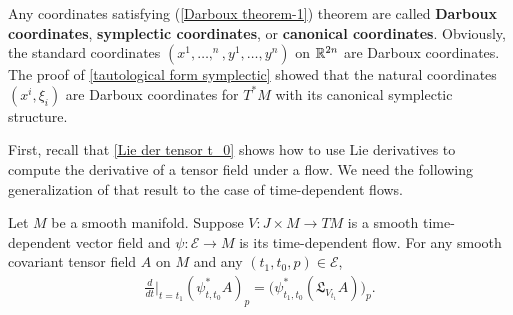 Any coordinates satisfying (\ref{Darboux theorem-1}) theorem are called \textbf{Darboux coordinates}, \textbf{symplectic coordinates}, or \textbf{canonical coordinates}. Obviously, the standard coordinates $(x^1,\dots,^n,y^1,\dots,y^n)$ on $\mathbb{R}^{2n}$ are Darboux coordinates. The proof of \cref{tautological form symplectic} showed that the natural coordinates $(x^i,\xi_i)$ are Darboux coordinates for $T^*M$ with its canonical symplectic structure.\par
First, recall that \cref{Lie der tensor t_0} shows how to use Lie derivatives to compute the derivative of a tensor field under a flow. We need the following generalization of that result to the case of time-dependent flows.

\begin{proposition}\label{Lie der tensor t_0 time-dependent vector}
Let $M$ be a smooth manifold. Suppose $V:J\times M\to TM$ is a smooth time-dependent vector field and $\psi:\mathcal{E}\to M$ is its time-dependent flow. For any smooth covariant tensor field $A$ on $M$ and any $(t_1,t_0,p)\in\mathcal{E}$,
\begin{align}\label{Lie der tensor t_0 time-dependent vector-1}
\frac{d}{dt}\Big|_{t=t_1}(\psi_{t,t_0}^*A)_p=\big(\psi_{t_1,t_0}^*(\mathfrak{L}_{V_{t_1}}A)\big)_p.
\end{align}
\end{proposition}
